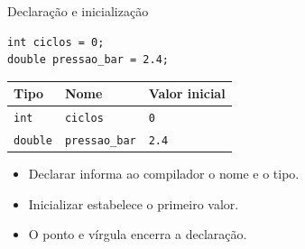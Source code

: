 \begin{frame}[fragile]{Declaração e inicialização}
\begin{lstlisting}
int ciclos = 0;
double pressao_bar = 2.4;
\end{lstlisting}
\begin{center}
\begin{tabular}{lll}
\toprule
Tipo & Nome & Valor inicial \\
\midrule
\texttt{int} & \texttt{ciclos} & \texttt{0} \\
\texttt{double} & \texttt{pressao\_bar} & \texttt{2.4} \\
\bottomrule
\end{tabular}
\end{center}
\begin{itemize}
\item Declarar informa ao compilador o nome e o tipo.
\item Inicializar estabelece o primeiro valor.
\item O ponto e vírgula encerra a declaração.
\end{itemize}
\end{frame}
